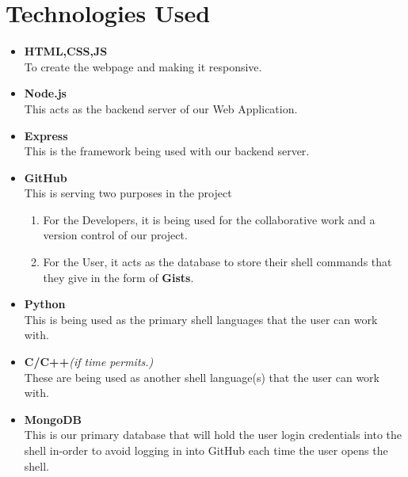 \documentclass[letterpaper,10pt]{article}
\begin{document}
  		\section{Technologies Used}
  		\begin{itemize}
  		\item \textbf{HTML,CSS,JS}\\
  		To create the webpage and making it responsive.
  		\item \textbf{Node.js}\\
  		This acts as the backend server of our Web Application.
  		\item \textbf{Express}\\
  		This is the framework being used with our backend server.
  		\item \textbf{GitHub}\\
  		This is serving two purposes in the project
  		\begin{enumerate}
  		\item For the Developers, it is being used for the collaborative work and a version control of our project.
  		\item For the User, it acts as the database to store their shell commands that they give in the form of \textbf{Gists}. 
  		\end{enumerate}
  		\item \textbf{Python}\\
  		This is being used as the primary shell languages that the user can work with.
  		\item \textbf{C/C++}\textit{(if time permits.)}\\
  		These are being used as another shell language(s) that the user can work with. 
  		\item \textbf{MongoDB}\\
  		This is our primary database that will hold the user login credentials into the shell in-order to avoid logging in into GitHub each time the user opens the shell.
  		\end{itemize}
\end{document}
